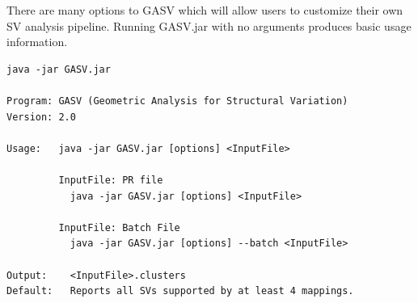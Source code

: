 \documentclass[11pt]{article}
\begin{document}
There are many options to GASV which will allow users to customize their own SV analysis pipeline. Running GASV.jar with no arguments produces basic usage information.

\begin{Verbatim}[frame=single]
java -jar GASV.jar

Program: GASV (Geometric Analysis for Structural Variation)
Version: 2.0

Usage:   java -jar GASV.jar [options] <InputFile>

         InputFile: PR file
           java -jar GASV.jar [options] <InputFile>

         InputFile: Batch File
           java -jar GASV.jar [options] --batch <InputFile>

Output:    <InputFile>.clusters
Default:   Reports all SVs supported by at least 4 mappings.
\end{Verbatim}
\end{document}
